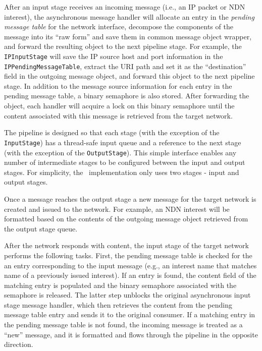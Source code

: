 After an input stage receives an incoming message (i.e., an IP packet or NDN interest), the asynchronous message handler will allocate an entry in the \emph{pending message table} for the network interface, decompose the components of the message into its ``raw form'' and save them in common message object wrapper, and forward the resulting object to the next pipeline stage. For example, the {\tt IPInputStage} will save the IP source host and port information in the {\tt IPPendingMessageTable}, extract the URI path and set it as the ``destination'' field in the outgoing message object, and forward this object to the next pipeline stage. In addition to the message source information for each entry in the pending message table, a binary semaphore is also stored. After forwarding the object, each handler will acquire a lock on this binary semaphore until the content associated with this message is retrieved from the target network. 

The pipeline is designed so that each stage (with the exception of the {\tt InputStage}) has a thread-safe input queue and a reference to the next stage (with the exception of the {\tt OutputStage}). This simple interface enables any number of intermediate stages to be configured between the input and output stages. For simplicity, the \sink\ implementation only uses two stages - input and output stages. 

Once a message reaches the output stage a new message for the target network is created and issued to the network. For example, an NDN interest will be formatted based on the contents of the outgoing message object retrieved from the output stage queue. 

After the network responds with content, the input stage of the target network performs the following tasks. First, the pending message table is checked for the an entry corresponding to the input message (e.g., an interest name that matches name of a previously issued interest). If an entry is found, the content field of the matching entry is populated and the binary semaphore associated with the semaphore is released. The latter step unblocks the original asynchronous input stage message handler, which then retrieves the content from the pending message table entry and sends it to the original consumer. If a matching entry in the pending message table is not found, the incoming message is treated as a ``new'' message, and it is formatted and flows through the pipeline in the opposite direction. 


